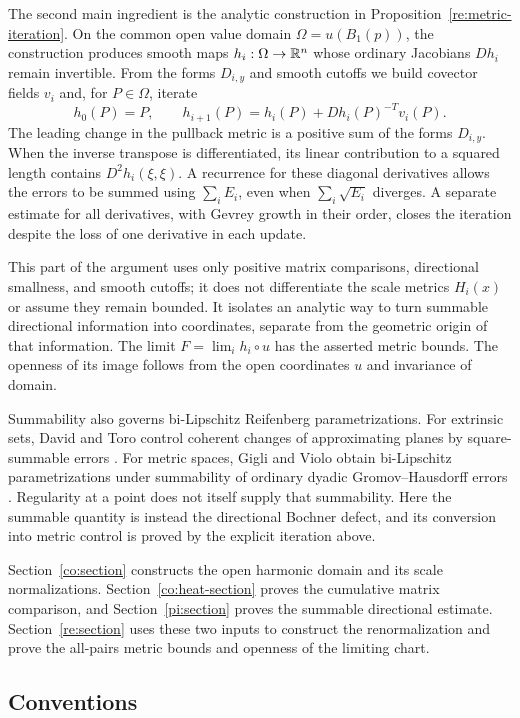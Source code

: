 The second main ingredient is the analytic construction in
Proposition~\ref{re:metric-iteration}. On the common open value
domain \(\Omega=u(B_1(p))\), the construction produces smooth maps
\(h_i:\Omega\to\mathbb R^n\) whose ordinary Jacobians \(Dh_i\) remain
invertible. From the forms \(D_{i,y}\) and smooth cutoffs we build
covector fields \(v_i\) and, for \(P\in\Omega\), iterate
\[
 h_0(P)=P,\qquad
 h_{i+1}(P)=h_i(P)+Dh_i(P)^{-T}v_i(P).
\]
The leading change in the pullback metric is a positive sum of the
forms \(D_{i,y}\). When the inverse transpose is differentiated, its
linear contribution to a squared length contains
\(D^2h_i(\xi,\xi)\). A recurrence for these diagonal derivatives
allows the errors to be summed using \(\sum_i E_i\), even when
\(\sum_i\sqrt{E_i}\) diverges. A separate estimate for all derivatives,
with Gevrey growth in their order, closes the iteration despite the
loss of one derivative in each update.

This part of the argument uses only positive matrix comparisons,
directional smallness, and smooth cutoffs; it does not differentiate
the scale metrics \(H_i(x)\) or assume they remain bounded. It isolates
an analytic way to turn summable directional information into
coordinates, separate from the geometric origin of that information.
The limit \(F=\lim_i h_i\circ u\) has the asserted metric bounds.
The openness of its image follows from the open coordinates \(u\)
and invariance of domain.

Summability also governs bi-Lipschitz Reifenberg parametrizations.
For extrinsic sets, David and Toro control coherent changes of
approximating planes by square-summable errors
\cite[Proposition~8.34]{DT12}. For metric spaces, Gigli and Violo
obtain bi-Lipschitz parametrizations under summability of ordinary
dyadic Gromov--Hausdorff errors \cite[Theorems~2.2 and 2.7]{GV25}.
Regularity at a point does not itself supply that summability.
Here the summable quantity is instead the directional Bochner
defect, and its conversion into metric control is proved by the
explicit iteration above.

Section~\ref{co:section} constructs the open harmonic domain and
its scale normalizations. Section~\ref{co:heat-section} proves the
cumulative matrix comparison, and Section~\ref{pi:section} proves
the summable directional estimate. Section~\ref{re:section} uses
these two inputs to construct the renormalization and prove the
all-pairs metric bounds and openness of the limiting chart.

\subsection{Conventions}

